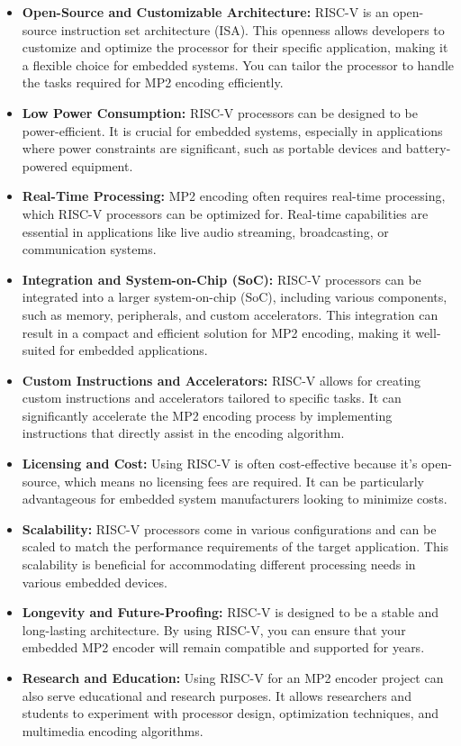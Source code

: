 \begin{itemize}
    \item \textbf{Open-Source and Customizable Architecture:} RISC-V is an open-source instruction set architecture (ISA). This openness allows developers to customize and optimize the processor for their specific application, making it a flexible choice for embedded systems. You can tailor the processor to handle the tasks required for MP2 encoding efficiently.
    \item \textbf{Low Power Consumption:} RISC-V processors can be designed to be power-efficient. It is crucial for embedded systems, especially in applications where power constraints are significant, such as portable devices and battery-powered equipment.
    \item \textbf{Real-Time Processing:} MP2 encoding often requires real-time processing, which RISC-V processors can be optimized for. Real-time capabilities are essential in applications like live audio streaming, broadcasting, or communication systems.
    \item \textbf{Integration and System-on-Chip (SoC):} RISC-V processors can be integrated into a larger system-on-chip (SoC), including various components, such as memory, peripherals, and custom accelerators. This integration can result in a compact and efficient solution for MP2 encoding, making it well-suited for embedded applications.
    \item \textbf{Custom Instructions and Accelerators:} RISC-V allows for creating custom instructions and accelerators tailored to specific tasks. It can significantly accelerate the MP2 encoding process by implementing instructions that directly assist in the encoding algorithm.
    \item \textbf{Licensing and Cost:} Using RISC-V is often cost-effective because it's open-source, which means no licensing fees are required. It can be particularly advantageous for embedded system manufacturers looking to minimize costs.
    \item \textbf{Scalability:} RISC-V processors come in various configurations and can be scaled to match the performance requirements of the target application. This scalability is beneficial for accommodating different processing needs in various embedded devices.
    \item \textbf{Longevity and Future-Proofing:} RISC-V is designed to be a stable and long-lasting architecture. By using RISC-V, you can ensure that your embedded MP2 encoder will remain compatible and supported for years.
    \item \textbf{Research and Education:} Using RISC-V for an MP2 encoder project can also serve educational and research purposes. It allows researchers and students to experiment with processor design, optimization techniques, and multimedia encoding algorithms.
\end{itemize}

